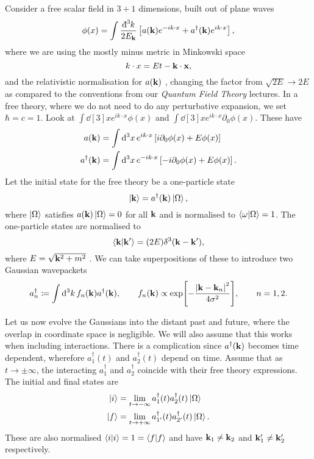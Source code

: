 Consider a free scalar field in $3 + 1$ dimensions, built out of plane waves
\begin{equation}
  \phi(x) = \int \frac{\bdd[3]{k}}{2E_{\vb{k}}} \left[ a(\vb{k}) e^{-i k \cdot x} + a^{\dagger} (\vb{k}) e^{i k \cdot x} \right],
\end{equation}
where we are using the mostly minus metric in Minkowski space
\begin{equation}
  k \cdot x = E t - \vb{k} \cdot \vb{x},
\end{equation}
and the relativistic normalisation for $a (\vb{k})$ , changing the factor from $\sqrt{2 E} \to 2 E$  as compared to the conventions from our \emph{Quantum Field Theory} lectures.
In a free theory, where we do not need to do any perturbative expansion, we set $\hbar = c = 1$.
Look at $\int \dd[3]{x} e^{i k \cdot x} \phi(x)$  and $\int \dd[3]{x} e^{i k \cdot x} \partial_0 \phi(x)$. These have
\begin{align}
  a(\vb{k}) &= \int \dd[3]{x} e^{i k \cdot x} \left[ i \partial_0 \phi(x) + E \phi(x) \right] \\
  a^{\dagger}(\vb{k}) &= \int \dd[3]{x} e^{-i k \cdot x} \left[ -i \partial_0 \phi(x) + E \phi(x) \right].
\end{align}
Let the initial state for the free theory be a one-particle state
\begin{equation}
  \ket{\vb{k}} = a^{\dagger}(\vb{k}) \ket{\Omega},
\end{equation}
where $\ket{\Omega}$ satisfies $a(\vb{k}) \ket{\Omega} = 0$ for all $\vb{k}$ and is normalised to $\bra{\omega}\ket{\Omega} = 1$.
The one-particle states are normalised to
\begin{equation}
  \bra{\vb{k}} \ket{\vb{k}'} = (2 E) \bdelta^3(\vb{k} - \vb{k}'),
\end{equation}
where $E = \sqrt{\vb{k}^2 + m^2}$ .
We can take superpositions of these to introduce two Gaussian wavepackets
\begin{equation}
  a_n^{\dagger} \coloneqq \int \dd[3]{k} f_n (\vb{k}) a^{\dagger}(\vb{k}),
  \qquad f_n(\vb{k}) \propto \exp[- \frac{\abs{\vb{k} - \vb{k}_n}^2}{4 \sigma^2}], \qquad n = 1, 2.
\end{equation}

Let us now evolve the Gaussians into the distant past and future, where the overlap in coordinate space is negligible.
We will also assume that this works when including interactions. There is a complication since $a^{\dagger}(\vb{k})$ becomes time dependent, wherefore $a_1^{\dagger}(t)$ and $a_2^{\dagger}(t)$ depend on time.
Assume that as $t \to \pm \infty$, the interacting $a_1^{\dagger}$ and $a_2^{\dagger}$ coincide with their free theory expressions.
The initial and final states are
\begin{align}
  \ket{i} &= \lim_{t \to -\infty} a_1^{\dagger}(t) a_2^{\dagger}(t) \ket{\Omega}  \\
  \ket{f} &=\lim_{t \to +\infty}  a_{1'}^{\dagger}(t) a_{2'}^{\dagger}(t) \ket{\Omega}.
\end{align}
These are also normalised $\bra{i}\ket{i} = 1 = \bra{f}\ket{f}$ and have $\vb{k}_1 \neq \vb{k}_2$ and $\vb{k}_1' \neq \vb{k}_2'$ respectively.

